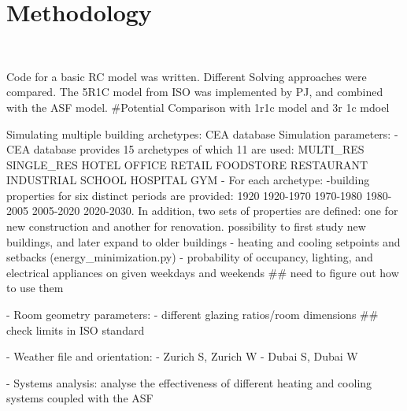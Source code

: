 
\chapter{Methodology}\
\label{ch:methodology}

Code for a basic RC model was written. Different Solving approaches were compared.
The 5R1C model from ISO was implemented by PJ, and combined with the ASF model.
#Potential Comparison with 1r1c model and 3r 1c mdoel

Simulating multiple building archetypes: CEA database
Simulation parameters: 
- CEA database provides 15 archetypes of which 11 are used: MULTI_RES SINGLE_RES HOTEL OFFICE RETAIL FOODSTORE RESTAURANT INDUSTRIAL SCHOOL HOSPITAL GYM 
- For each archetype:
	-building properties for six distinct periods are provided: 1920 1920-1970 1970-1980 1980-2005 2005-2020 2020-2030. In addition, two sets of properties are defined: one for new construction and another for renovation.
		possibility to first study new buildings, and later expand to older buildings
	- heating and cooling setpoints and setbacks (energy_minimization.py)
	- probability of occupancy, lighting, and electrical appliances on given weekdays and weekends ## need to figure out how to use them

- Room geometry parameters:
	- different glazing ratios/room dimensions ## check limits in ISO standard

- Weather file and orientation:
	- Zurich S, Zurich W
	- Dubai S, Dubai W

- Systems analysis: analyse the effectiveness of different heating and cooling systems coupled with the ASF



